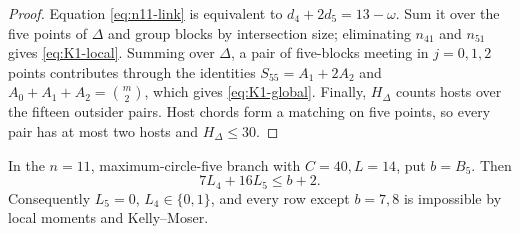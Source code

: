 \begin{proof}
Equation \eqref{eq:n11-link} is equivalent to
$d_4+2d_5=13-\omega$.  Sum it over the five points of $\Delta$ and group
blocks by intersection size; eliminating $n_{41}$ and $n_{51}$ gives
\eqref{eq:K1-local}.  Summing over $\Delta$, a pair of five-blocks meeting
in $j=0,1,2$ points contributes through the identities
$S_{55}=A_1+2A_2$ and $A_0+A_1+A_2=\binom m2$, which gives
\eqref{eq:K1-global}.  Finally, $H_\Delta$ counts hosts over the fifteen
outsider pairs.  Host chords form a matching on five points, so every pair
has at most two hosts and $H_\Delta\le30$.
\end{proof}

\begin{lemma}\label{lem:n11-K4}
In the $n=11$, maximum-circle-five branch with $C=40,L=14$, put $b=B_5$.
Then
\begin{equation}\label{eq:n11-K4-cut}
 7L_4+16L_5\le b+2.
\end{equation}
Consequently $L_5=0$, $L_4\in\{0,1\}$, and every row except
$b=7,8$ is impossible by local moments and Kelly--Moser.
\end{lemma}

